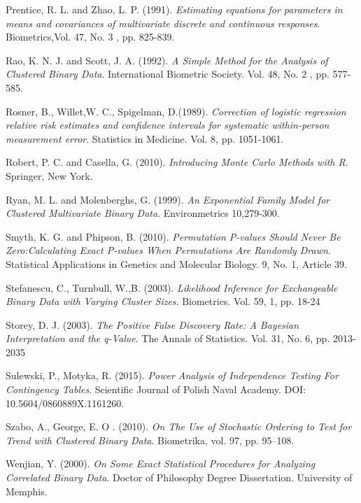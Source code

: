 \documentclass[12pt,oneside]{report}
\theoremstyle{definition}
\theoremstyle{mystyle}
\begin{document}
\begin{thebibliography}{99}
Prentice, R. L. and Zhao, L. P. (1991).\emph{ Estimating equations for parameters in means and covariances of multivariate discrete and continuous responses}. Biometrics,Vol. 47, No. 3 , pp. 825-839. 



Rao, K. N. J. and Scott, J. A. (1992). \emph{A Simple Method for the Analysis of Clustered Binary Data}. International Biometric Society. Vol. 48, No. 2 , pp. 577-585.

Rosner, B., Willet,W. C., Spigelman, D.(1989). \emph{Correction of logistic regression relative risk estimates and confidence intervals for systematic within-person measurement error}. Statistics in Medicine. Vol. 8, pp. 1051-1061.

Robert, P. C. and Casella, G. (2010). \emph{Introducing Monte Carlo Methods with R}. Springer, New York.



Ryan, M. L. and  Molenberghs, G. (1999). \emph{An Exponential Family Model for Clustered Multivariate  Binary Data}.  Environmetrics 10,279-300.



Smyth, K. G. and Phipson, B. (2010). \emph{Permutation P-values Should Never Be Zero:Calculating Exact P-values When Permutations Are Randomly Drawn}. Statistical Applications in Genetics and Molecular Biology. 9, No. 1, Article 39.

 Stefanescu, C., Turnbull, W.,B. (2003).  \emph{Likelihood Inference for Exchangeable Binary Data with Varying Cluster Sizes}. Biometrics. Vol. 59, 1, pp. 18-24

Storey, D. J. (2003).  \emph{The Positive False Discovery Rate: A Bayesian Interpretation and the q-Value}. The Annals of Statistics. Vol. 31, No. 6, pp. 2013-2035




Sulewski, P., Motyka, R. (2015). \emph{ Power Analysis of Independence Testing For Contingency Tables}.  Scientific Journal of Polish Naval Academy. DOI: 10.5604/0860889X.1161260.

Szabo, A., George, E. O . (2010). \emph{ On The Use of Stochastic Ordering to Test for Trend with Clustered Binary Data}. Biometrika, vol. 97, pp. 95–108.

Wenjian, Y. (2000). \emph{On Some Exact Statistical Procedures for Analyzing Correlated Binary Data}. Doctor of Philosophy Degree Dissertation. University of Memphis.




\end{thebibliography}
\end{document}
